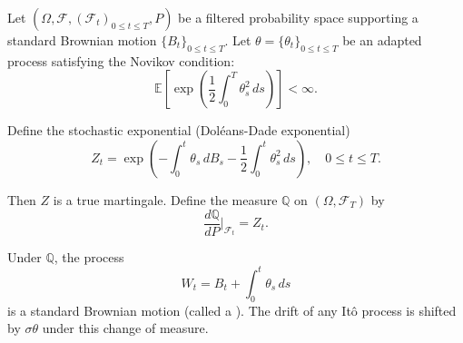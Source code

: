 \begin{theorem} \label{theorem:girsanov_theorem_for_change_of_measure_on_brownian_motion}
Let $(\Omega, \mathcal{F}, (\mathcal{F}_t)_{0 \leq t \leq T}, P)$ be a filtered probability space supporting a standard Brownian motion $\{B_t\}_{0 \leq t \leq T}$. Let $\theta = \{\theta_t\}_{0 \leq t \leq T}$ be an adapted process satisfying the Novikov condition:
$$\mathbb{E}\left[\exp\left(\frac{1}{2} \int_0^T \theta_s^2 \, ds\right)\right] < \infty.$$

Define the stochastic exponential (Doléans-Dade exponential)
$$Z_t = \exp\left(-\int_0^t \theta_s \, dB_s - \frac{1}{2} \int_0^t \theta_s^2 \, ds\right), \quad 0 \leq t \leq T.$$

Then $Z$ is a true martingale. Define the measure $\mathbb{Q}$ on $(\Omega, \mathcal{F}_T)$ by
$$\frac{d\mathbb{Q}}{dP}\bigg|_{\mathcal{F}_t} = Z_t.$$

Under $\mathbb{Q}$, the process
$$W_t = B_t + \int_0^t \theta_s \, ds$$
is a standard Brownian motion (called a ). The drift of any Itô process is shifted by $\sigma \theta$ under this change of measure.
\end{theorem}